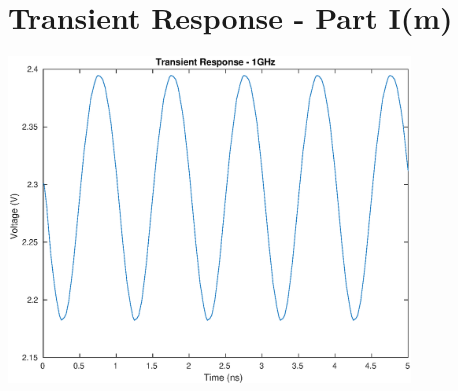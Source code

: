\documentclass[12pt,a4paper]{article}
\begin{document}
\pagebreak


\section{Transient Response - Part I(m)}

{\centering
	\includegraphics[width=0.8\textwidth]{plots/part_m.eps}
\par}

\pagebreak
\end{document}
